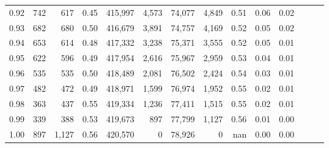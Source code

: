 \begin{tabular}{rrrrrrrrrrrrrr}
0.92 &    742 &    617 &  0.45 &  415,997 &    4,573 &  74,077 &   4,849 &  0.51 &  0.06 &      0.02 \\
0.93 &    682 &    680 &  0.50 &  416,679 &    3,891 &  74,757 &   4,169 &  0.52 &  0.05 &      0.02 \\
0.94 &    653 &    614 &  0.48 &  417,332 &    3,238 &  75,371 &   3,555 &  0.52 &  0.05 &      0.01 \\
0.95 &    622 &    596 &  0.49 &  417,954 &    2,616 &  75,967 &   2,959 &  0.53 &  0.04 &      0.01 \\
0.96 &    535 &    535 &  0.50 &  418,489 &    2,081 &  76,502 &   2,424 &  0.54 &  0.03 &      0.01 \\
0.97 &    482 &    472 &  0.49 &  418,971 &    1,599 &  76,974 &   1,952 &  0.55 &  0.02 &      0.01 \\
0.98 &    363 &    437 &  0.55 &  419,334 &    1,236 &  77,411 &   1,515 &  0.55 &  0.02 &      0.01 \\
0.99 &    339 &    388 &  0.53 &  419,673 &      897 &  77,799 &   1,127 &  0.56 &  0.01 &      0.00 \\
1.00 &    897 &  1,127 &  0.56 &  420,570 &        0 &  78,926 &       0 &   nan &  0.00 &      0.00 \\
\bottomrule
\end{tabular}

